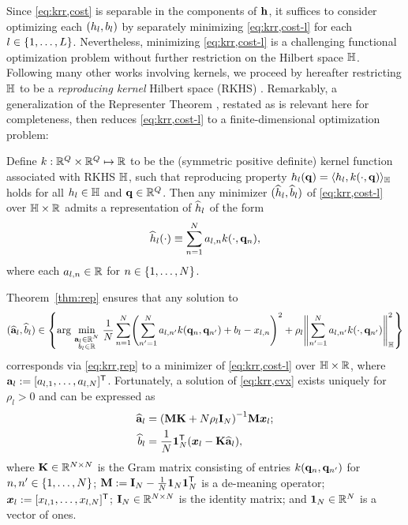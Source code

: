 Since \eqref{eq:krr,cost} is separable 
in the components of $\mathbf{h}$, 
it suffices to consider optimizing each $\paren{h_l,b_l}$ 
by separately minimizing \eqref{eq:krr,cost-l}
for each $l \in \set{1,\dots,L}$.
Nevertheless, 
minimizing \eqref{eq:krr,cost-l} 
is a challenging functional optimization problem
without further restriction 
on the Hilbert space $\mathbb{H}$.
Following many other works involving kernels,
we proceed by hereafter restricting $\mathbb{H}$
to be a \emph{reproducing kernel} Hilbert space 
(RKHS) \cite{aronszajn:50:tor}.
Remarkably,
a generalization
of the Representer Theorem \cite{scholkopf:01:agr},
restated as is relevant here for completeness,
then reduces \eqref{eq:krr,cost-l}
to a finite-dimensional optimization problem:
\begin{thm}
	Define $k : \mathbb{R}^{Q} \times \mathbb{R}^{Q} \mapsto \mathbb{R}$
	to be the (symmetric positive definite) kernel function 
	associated with RKHS $\mathbb{H}$, 
	such that reproducing property $h_l(\mathbf{q}) = \langle h_l,k(\cdot,\mathbf{q}) \rangle_{\mathbb{H}}$
	holds for all $h_l \in \mathbb{H}$ and $\mathbf{q} \in \mathbb{R}^{Q}$. 
	Then any minimizer $(\widehat{h}_l,\widehat{b}_l)$ of \eqref{eq:krr,cost-l}
	over $\mathbb{H} \times \mathbb{R}$
	admits a representation of $\widehat{h}_l$ of the form
	\label{thm:rep}
	\begin{align}
		\widehat{h}_l(\cdot) \equiv \sum_{n=1}^N a_{l,n} k(\cdot,\mathbf{q}_{n}),
		\label{eq:krr,rep}
	\end{align}
	where each $a_{l,n} \in \mathbb{R}$ for $n \in \set{1,\dots,N}$.
\end{thm}
Theorem~\ref{thm:rep} ensures that any solution to 
\begin{align}
	(\est{\bma}_l,\est{b}_l) \in 
	\set{\argmin{\substack{\bma_l \in \reals{N} \\ b_l \in \real}} 
		\frac{1}{N} \sum_{n=1}^N \paren{\sum_{n'=1}^N a_{l,n'} k(\bmq_n,\bmq_{n'}) 
		+ b_l - x_{l,n}}^2 +
		\rho_l \norm{\sum_{n'=1}^N a_{l,n'} k(\cdot,\bmq_{n'})}^2_\hilb}
	\label{eq:krr,cvx}
\end{align}
corresponds via \eqref{eq:krr,rep} 
to a minimizer of \eqref{eq:krr,cost-l}
over $\mathbb{H} \times \mathbb{R}$,
where $\mathbf{a}_l := [a_{l,1},\dots,a_{l,N}]^{\mathsf{T}}$.
Fortunately, a solution of \eqref{eq:krr,cvx} exists uniquely
for $\rho_l > 0$
and can be expressed as
\begin{align}
	\est{\bma}_l &= \inv{\bmM \bmK + N\rho_l\eye{N}} \bmM \bmxg{l};
	\label{eq:krr,a-hat} \\
	\est{b}_l &= \frac{1}{N} \ones{N}\tpose \paren{\bmxg{l} - \bmK \est{\bma}_l},
	\label{eq:krr,b-hat}
\end{align}
where 
$\mathbf{K} \in \mathbb{R}^{N \times N}$ is the Gram matrix 
consisting of entries $k(\mathbf{q}_n,\mathbf{q}_{n'})$ for $n,n' \in \set{1,\dots,N}$;
$\mathbf{M} := \mathbf{I}_{N}-\frac{1}{N}\boldsymbol{1}_{N}\boldsymbol{1}_{N}^{\mathsf{T}}$ is a de-meaning operator;
$\boldsymbol{x}_{l} := [x_{l,1},\dots,x_{l,N}]^{\mathsf{T}}$;
$\mathbf{I}_{N} \in \mathbb{R}^{N \times N}$ is the identity matrix;
and $\boldsymbol{1}_{N} \in \mathbb{R}^{N}$ is a vector of ones.

